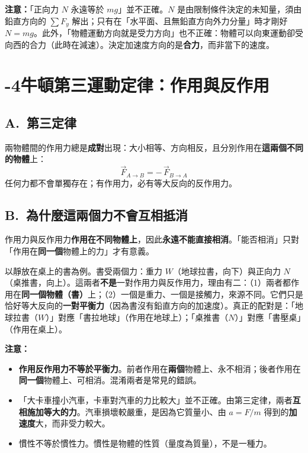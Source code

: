 \documentclass[11pt]{article}
\begin{document}
\textbf{注意：}「正向力 $N$ 永遠等於 $mg$」並不正確。$N$ 是由限制條件決定的未知量，須由鉛直方向的 $\sum F_y$ 解出；只有在「水平面、且無鉛直方向外力分量」時才剛好 $N=mg$。此外，「物體運動方向就是受力方向」也不正確：物體可以向東運動卻受向西的合力（此時在減速）。決定加速度方向的是\textbf{合力}，而非當下的速度。

\section*{-4\quad 牛頓第三運動定律：作用與反作用}

\subsection*{\sffamily A.\ 第三定律}

兩物體間的作用力總是\textbf{成對}出現：大小相等、方向相反，且分別作用在\textbf{這兩個不同的物體}上：
$$\boxed{\;\vec F_{A\to B} = -\,\vec F_{B\to A}\;}$$
任何力都不會單獨存在；有作用力，必有等大反向的反作用力。


\subsection*{\sffamily B.\ 為什麼這兩個力不會互相抵消}

作用力與反作用力\textbf{作用在不同物體上}，因此\textbf{永遠不能直接相消}。「能否相消」只對「作用在\textbf{同一個}物體上的力」才有意義。

以靜放在桌上的書為例。書受兩個力：重力 $W$（地球拉書，向下）與正向力 $N$（桌推書，向上）。這兩者\textbf{不是}一對作用力與反作用力，理由有二：（1）兩者都作用在\textbf{同一個物體（書）}上；（2）一個是重力、一個是接觸力，來源不同。它們只是恰好等大反向的\textbf{一對平衡力}（因為書沒有鉛直方向的加速度）。真正的配對是：「地球拉書（$W$）」對應「書拉地球」（作用在地球上）；「桌推書（$N$）」對應「書壓桌」（作用在桌上）。

\textbf{注意：}
\begin{itemize}\setlength{\itemsep}{1pt}
\item \textbf{作用反作用力不等於平衡力}。前者作用在\textbf{兩個}物體上、永不相消；後者作用在\textbf{同一個}物體上、可相消。混淆兩者是常見的錯誤。
\item 「大卡車撞小汽車，卡車對汽車的力比較大」並不正確。由第三定律，兩者\textbf{互相施加等大的力}。汽車損壞較嚴重，是因為它質量小、由 $a=F/m$ 得到的\textbf{加速度}大，而非受力較大。
\item 慣性不等於慣性力。慣性是物體的性質（量度為質量），不是一種力。
\end{itemize}
\end{document}
